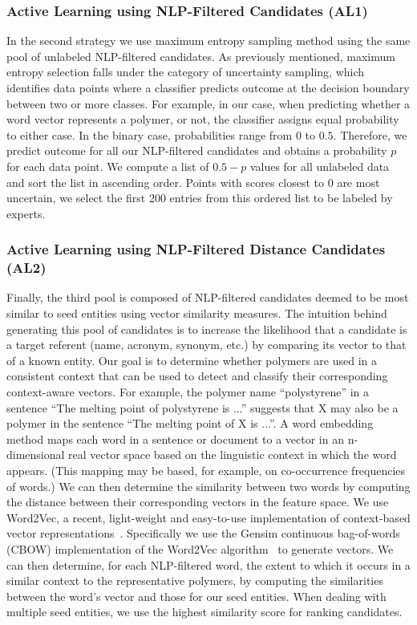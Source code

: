 \subsubsection{Active Learning using NLP-Filtered Candidates (AL1)}
In the second strategy we use maximum entropy sampling method using the same pool of unlabeled NLP-filtered candidates.
As previously mentioned, maximum entropy selection falls under the category of uncertainty sampling, which identifies data points where a classifier predicts outcome at the decision boundary between two or more classes. 
For example, in our case, when predicting whether a word vector represents a polymer, or not, the classifier assigns equal probability to either case.
In the binary case, probabilities range from $0$ to $0.5$. Therefore, we predict outcome for all our NLP-filtered candidates and obtains a probability $p$ for each data point. We compute a list of $0.5-p$ values for all unlabeled data and sort the list in ascending order.
Points with scores closest to $0$ are most uncertain, we select the first 200 entries from this ordered list to be labeled by experts.

\subsubsection{Active Learning using NLP-Filtered Distance Candidates (AL2)}
Finally, the third pool is composed of NLP-filtered candidates deemed to be most similar to seed entities using vector similarity measures.
The intuition behind generating this pool of candidates is to increase the likelihood that a candidate is a target referent (name, acronym, synonym, etc.) by comparing its vector to that of a known entity.
Our goal is to determine whether polymers are used in a consistent context that can be used to detect and classify their corresponding context-aware vectors.
For example, the polymer name ``polystyrene'' in a sentence ``The
melting point of polystyrene is ...'' suggests that X may also be a polymer in the
sentence ``The melting point of X is ...''.
A word embedding method maps each word
in a sentence or document to a vector in an n-dimensional real vector space
based on the linguistic context in which the word appears. (This mapping may
be based, for example, on co-occurrence frequencies of words.) 
We can then
determine the similarity between two words by computing the distance between
their corresponding vectors in the feature space.
We use Word2Vec, a recent, light-weight and easy-to-use implementation of context-based vector representations~\cite{mikolov2013efficient,mikolov2013distributed}.
Specifically we use the Gensim continuous bag-of-words
(CBOW) implementation of the Word2Vec
algorithm~\cite{rehurek2010software} to generate vectors.
We can then determine, for each NLP-filtered word, the extent to which it occurs
in a similar context to the representative polymers, by computing the similarities
between the word's vector and those for our seed entities. 
When dealing with multiple seed entities, we use the highest similarity score for ranking candidates.

